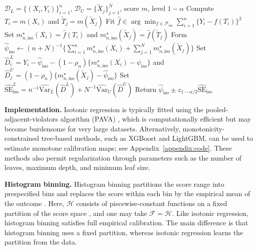\documentclass{article}
\theoremstyle{plain}
\theoremstyle{definition}
\newcommand{\Var}{\mathrm{Var}}
\newcommand{\1}{\mathbbm{1}}
\newcommand{\mhat}{m}
\newcommand{\rhon}{\rho_n}
\begin{document}
\begin{algorithm}[t]
\caption{Isotonic-calibrated PPI}
\label{alg:isoppi}
\begin{algorithmic}[1]
\Require \(\mathcal D_L=\{(X_i,Y_i)\}_{i=1}^n\), \(\mathcal D_U=\{\widetilde X_j\}_{j=1}^N\), score \(\mhat\), level \(1-\alpha\)
\State Compute \(T_i=\mhat(X_i)\) and \(\widetilde T_j=\mhat(\widetilde X_j)\)
\State Fit \(\hat f\in\arg\min_{f\in\mathcal F_{\mathrm{iso}}}\sum_{i=1}^n\{Y_i-f(T_i)\}^2\)
\State Set \(m_{n,\mathrm{iso}}^\star(X_i)=\hat f(T_i)\) and \(m_{n,\mathrm{iso}}^\star(\widetilde X_j)=\hat f(\widetilde T_j)\)
\State Form \(\widehat\psi_{\mathrm{iso}}\gets (n+N)^{-1}\{\sum_{i=1}^n m_{n,\mathrm{iso}}^\star(X_i)+\sum_{j=1}^N m_{n,\mathrm{iso}}^\star(\widetilde X_j)\}\)
\State Set \(\widehat D_i^L=Y_i-\widehat\psi_{\mathrm{iso}}-(1-\rhon)\{m_{n,\mathrm{iso}}^\star(X_i)-\widehat\psi_{\mathrm{iso}}\}\) and \(\widehat D_j^U=(1-\rhon)\{m_{n,\mathrm{iso}}^\star(\widetilde X_j)-\widehat\psi_{\mathrm{iso}}\}\)
\State Set \(\widehat{\mathrm{SE}}_{\mathrm{iso}}^2=n^{-1}\widehat{\Var}_L(\widehat D^L)+N^{-1}\widehat{\Var}_U(\widehat D^U)\)
\State Return \(\widehat\psi_{\mathrm{iso}} \pm z_{1-\alpha/2}\widehat{\mathrm{SE}}_{\mathrm{iso}}\)
\end{algorithmic}
\end{algorithm}

\noindent\textbf{Implementation.}
Isotonic regression is typically fitted using the
pooled-adjacent-violators algorithm (PAVA)
\citep{barlow1972isotonic}, which is computationally efficient
but may become burdensome for very large datasets.
Alternatively, monotonicity-constrained tree-based methods,
such as XGBoost and LightGBM, can be used to estimate
monotone calibration maps; see Appendix~\ref{appendix:code}.
These methods also permit regularization through parameters
such as the number of leaves, maximum depth, and minimum
leaf size.

\noindent\textbf{Histogram binning.}
Histogram binning partitions the score range into prespecified
bins and replaces the score within each bin by the empirical
mean of the outcome
\citep{zadrozny2001obtaining,zadrozny2002transforming}.
Here, $\mathcal H$ consists of piecewise-constant functions
on a fixed partition of the score space
\citep{gupta2020distribution,gupta2021distribution}, and
one may take $\mathcal F=\mathcal H$.
Like isotonic regression, histogram binning satisfies full
empirical calibration. The main difference is that histogram
binning uses a fixed partition, whereas isotonic regression
learns the partition from the data.
\end{document}

